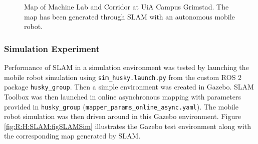 \begin{figure}[htp!]
  \centering
  
  \caption{Map of Machine Lab and Corridor at UiA Campus Grimstad. The map has been generated through SLAM with an autonomous mobile robot.}
  \label{fig:R:AN:SLAM:figUiaMap}
\end{figure}

\FloatBarrier
\subsubsection{Simulation Experiment}
Performance of SLAM in a simulation environment was tested by launching the mobile robot simulation using \lstinline{sim_husky.launch.py} from the custom ROS 2 package \lstinline{husky_group}. Then a simple environment was created in Gazebo. SLAM Toolbox was then launched in online asynchronous mapping with parameters provided in \lstinline{husky_group} (\lstinline{mapper_params_online_async.yaml}). The mobile robot simulation was then driven around in this Gazebo environment. Figure \ref{fig:R:H:SLAM:figSLAMSim} illustrates the Gazebo test environment along with the corresponding map generated by SLAM.

